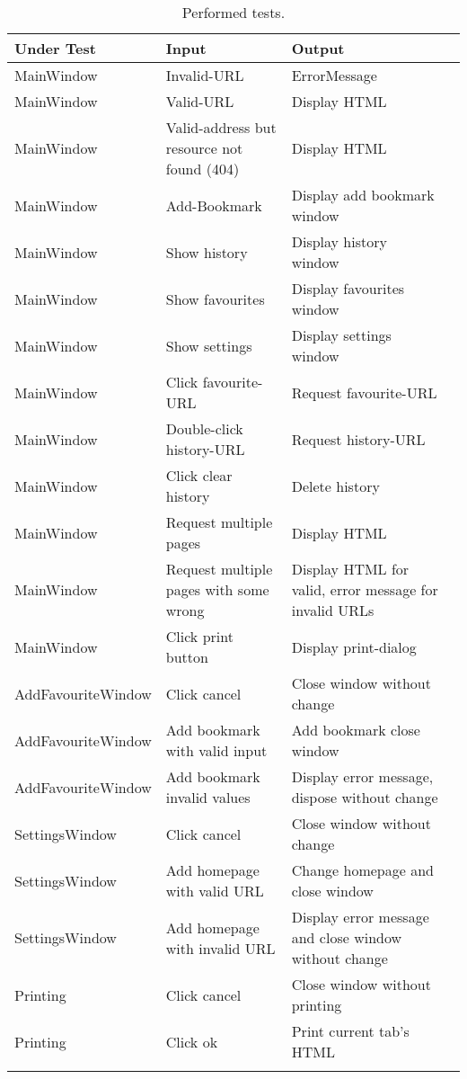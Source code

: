 \begin{longtable}{X X X X}
\hline Under Test & Input & Output \\
\hline 
\hline MainWindow & Invalid-\ac{URL} & ErrorMessage \\
\hline MainWindow & Valid-\ac{URL} & Display \ac{HTML} \\
\hline MainWindow & Valid-address but resource not found (404) & Display \ac{HTML} \\
\hline MainWindow & Add-Bookmark & Display add bookmark window \\
\hline MainWindow & Show history & Display history window \\
\hline MainWindow & Show favourites & Display favourites window \\
\hline MainWindow & Show settings & Display settings window \\
\hline MainWindow & Click favourite-\ac{URL} & Request favourite-\ac{URL} \\
\hline MainWindow & Double-click history-\ac{URL} & Request history-\ac{URL} \\
\hline MainWindow & Click clear history & Delete history \\
\hline MainWindow & Request multiple pages & Display \ac{HTML} \\
\hline MainWindow & Request multiple pages with some wrong & Display \ac{HTML} for valid, error message for invalid \ac{URL}s \\
\hline MainWindow & Click print button & Display print-dialog \\
\hline
\hline AddFavouriteWindow & Click cancel & Close window without change \\
\hline AddFavouriteWindow & Add bookmark with valid input & Add bookmark close window \\
\hline AddFavouriteWindow & Add bookmark invalid values & Display error message, dispose without change \\
\hline
\hline SettingsWindow & Click cancel & Close window without change \\
\hline SettingsWindow & Add homepage with valid \ac{URL} & Change homepage and close window \\
\hline SettingsWindow & Add homepage with invalid \ac{URL} & Display error message and close window without change \\
\hline
\hline Printing & Click cancel & Close window without printing \\
\hline Printing & Click ok & Print current tab's \ac{HTML} \\
\caption{Performed tests.}
\end{longtable}